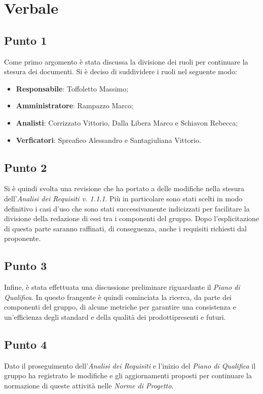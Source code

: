 \section{Verbale}
    \subsection{Punto 1}
        Come primo argomento è stata discussa la divisione dei ruoli per continuare la stesura dei documenti. Si è deciso di suddividere i ruoli nel seguente modo:
        \begin{itemize}
            \item \textbf{Responsabile}: Toffoletto Massimo;
            \item \textbf{Amministratore}: Rampazzo Marco;
            \item \textbf{Analisti}: Corrizzato Vittorio, Dalla Libera Marco e Schiavon Rebecca;
            \item \textbf{Verficatori}: Spreafico Alessandro e Santagiuliana Vittorio. 
        \end{itemize}
    \subsection{Punto 2}
        Si è quindi svolta una revisione che ha portato a delle modifiche nella stesura dell'\textit{Analisi dei Requisiti v. 1.1.1}. Più in particolare sono stati scelti in modo definitivo i casi d'uso che sono stati successivamente indicizzati per facilitare la divisione della redazione di essi tra i componenti del gruppo. Dopo l'esplicitazione di questa parte saranno raffinati, di conseguenza, anche i requisiti richiesti dal proponente.
    \subsection{Punto 3}
        Infine, è stata effettuata una discussione preliminare riguardante il \textit{Piano di Qualifica}. In questo frangente è quindi cominciata la ricerca, da parte dei componenti del gruppo, di alcune metriche per garantire una consistenza e un'efficienza degli standard e della qualità dei prodotti\glosp presenti e futuri.
    \subsection{Punto 4}
        Dato il proseguimento dell'\textit{Analisi dei Requisiti} e l'inizio del \textit{Piano di Qualifica} il gruppo ha registrato le modifiche e gli aggiornamenti proposti per continuare la normazione di queste attività nelle \textit{Norme di Progetto}.